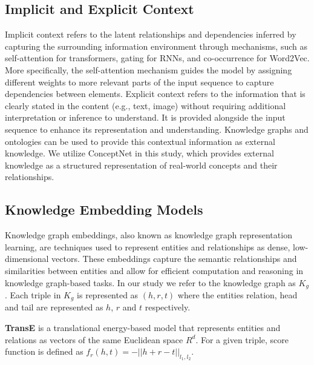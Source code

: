 \subsection{Implicit and Explicit Context}
\label{sec:implicit-explicit-context}
Implicit context refers to the latent relationships and dependencies inferred by capturing the surrounding information environment through mechanisms, such as self-attention for transformers, gating for RNNs, and co-occurrence for Word2Vec. More specifically, the self-attention mechanism 
guides the model by assigning different weights to more relevant parts of the input sequence to capture dependencies between elements.
Explicit context refers to the information that is clearly stated in the content (e.g., text, image) without requiring additional interpretation or inference to understand. It is provided 
alongside the input sequence to enhance its representation and understanding. Knowledge graphs and ontologies can be used to provide this contextual information as external knowledge. We utilize ConceptNet in this study, which provides external knowledge as a structured representation of real-world concepts and their relationships.

\subsection{Knowledge Embedding Models}
\label{sec:knowledge-embedding-models}

Knowledge graph embeddings, also known as knowledge graph representation learning, are techniques used to represent entities and relationships as dense, low-dimensional vectors. These embeddings capture the semantic relationships and similarities between entities and allow for efficient computation and reasoning in knowledge graph-based tasks. In our study we refer to the knowledge graph as $K_g$. Each triple in $K_g$ is represented as $(h,r,t)$ where the entities relation, head and tail are represented as  $h$, $r$ and $t$ respectively.

\textbf{TransE} \cite{bordes2013translating} is a translational energy-based model that represents entities and relations as vectors of the same Euclidean space $R^d$. For a given triple, score function is defined as $f_r(h,t) = -||h+r-t||_{l_1,l_2}$.

